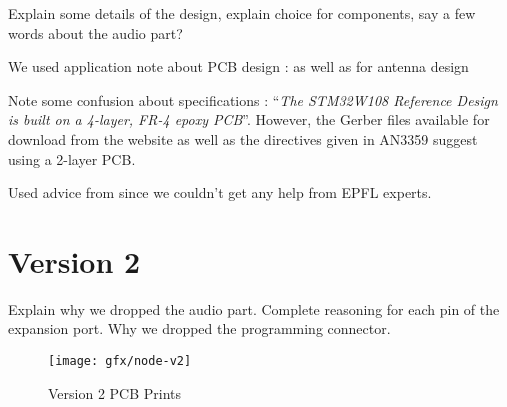 \begin{table}[tbh]
    \myfloatalign
  \caption[Antenna Comparison]{Antenna Comparison}
  \label{tab:antennas}
\end{table}

Explain some details of the design, explain choice for components, say a few
words about the audio part?

We used application note about PCB design : \cite{AN3206} as well as
\cite{AN3359} for antenna design

Note some confusion about specifications : ``\emph{The STM32W108 Reference
Design is built on a 4-layer, FR-4 epoxy PCB}''\citep{AN3206}. However, the
Gerber files available for download from the website as well as the directives
given in AN3359\cite{AN3359} suggest using a 2-layer PCB.

Used advice from \cite{DropoutGuide} since we couldn't get any help from EPFL
experts.


\section{Version 2}

Explain why we dropped the audio part.
Complete reasoning for each pin of the expansion port.
Why we dropped the programming connector.

\begin{figure}[htb]
  \begin{center}
    \texttt{[image: gfx/node-v2]}
  \end{center}
  \caption{Version 2 PCB Prints}
  \label{fig:v2-prints}
\end{figure}

